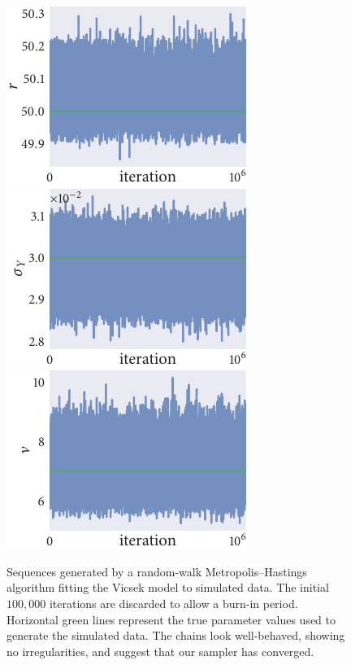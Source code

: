 \begin{figure}[tbp]
  \includegraphics{r_trace_r.pdf}%
  \includegraphics{r_trace_sigma_Y.pdf}%
  \includegraphics{r_trace_nu.pdf}
  \caption{Sequences generated by a random-walk Metropolis--Hastings algorithm
    fitting the Vicsek model to simulated data. The initial $100,000$
    iterations are discarded to allow a burn-in period. Horizontal green
    lines represent the true parameter values used to generate the simulated
    data. The chains look well-behaved, showing no irregularities, and suggest
    that our sampler has converged.}
  \label{fig:vicsek_trace}
\end{figure}%
